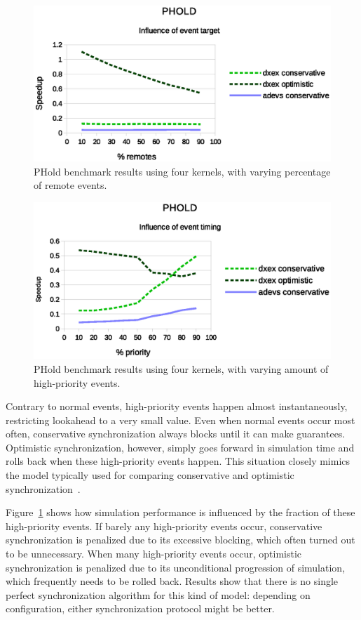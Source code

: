 \begin{figure}
    \center
    \includegraphics[width=\columnwidth]{fig/phold_remotes.eps}
    \caption{PHold benchmark results using four kernels, with varying percentage of remote events.}
\end{figure}

\begin{figure}
	\center
	\includegraphics[width=\columnwidth]{fig/phold_priority.eps}
	\caption{PHold benchmark results using four kernels, with varying amount of high-priority events.}
	\label{fig:phold_priority}
\end{figure}

Contrary to normal events, high-priority events happen almost instantaneously, restricting lookahead to a very small value.
Even when normal events occur most often, conservative synchronization always blocks until it can make guarantees.
Optimistic synchronization, however, simply goes forward in simulation time and rolls back when these high-priority events happen.
This situation closely mimics the model typically used for comparing conservative and optimistic synchronization~\cite{FujimotoBook}.

Figure~\ref{fig:phold_priority} shows how simulation performance is influenced by the fraction of these high-priority events.
If barely any high-priority events occur, conservative synchronization is penalized due to its excessive blocking, which often turned out to be unnecessary.
When many high-priority events occur, optimistic synchronization is penalized due to its unconditional progression of simulation, which frequently needs to be rolled back.
Results show that there is no single perfect synchronization algorithm for this kind of model: depending on configuration, either synchronization protocol might be better.

